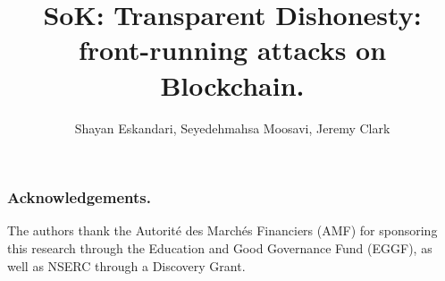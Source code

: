 \documentclass[envcountsect]{llncs}
\begin{document}
\frontmatter
\mainmatter

\title{SoK: Transparent Dishonesty: front-running attacks on Blockchain.}
\author{}

\author{
	Shayan Eskandari\inst{\dag\ddag},
	Seyedehmahsa Moosavi\inst{\dag},
	Jeremy Clark\inst{\dag}
	}

	
	
\maketitle








\subsubsection*{Acknowledgements.}
The authors thank the Autorit\'e des March\'es Financiers (AMF) for sponsoring this research through the Education and Good Governance Fund (EGGF), as well as NSERC through a Discovery Grant. 






\end{document}
